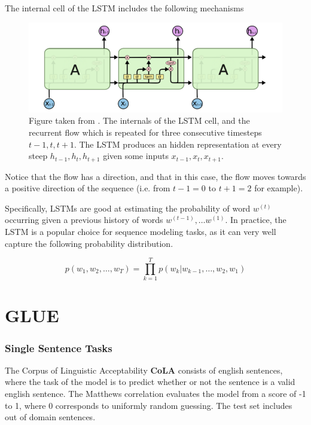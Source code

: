 \documentclass[a4paper,12pt,twoside,openright]{report}
\begin{document}
The internal cell of the LSTM includes the following mechanisms

\begin{figure}[h]
	\center
  \includegraphics[width=\linewidth]{./assets/background/LSTM.png}
  \caption{Figure taken from \cite{colahLSTM}. The internals of the LSTM cell, and the recurrent flow which is repeated for three consecutive timesteps $t-1, t, t+1$. 
  The LSTM produces an hidden representation at every steep $h_{t-1}, h_{t}, h_{t+1}$ given some inputs $x_{t-1}, x_t, x_{t+1}$.
  }
  \label{fig:lstm_internals}
\end{figure}

Notice that the flow has a direction, and that in this case, the flow moves towards a positive direction of the sequence (i.e. from $t-1 = 0$ to $t + 1 = 2$ for example).

Specifically, LSTMs \cite{hochreiter97} are good at estimating the probability of word $w^{(t)}$ occurring given a previous history of words $w^{(t-1)}, \ldots w^{(1)}$.
In practice, the LSTM is a popular choice for sequence modeling tasks, as it can very well capture the following probability distribution.

\begin{equation}
p\left(w_{1},  w_{2}, \ldots, w_{T} \right)=\prod_{k=1}^{T} p\left(w_{k} | w_{k-1}, \ldots, w_{2}, w_{1}\right)
\end{equation}

\section{GLUE}\label{appendix:GLUE}

\subsubsection{Single Sentence Tasks}

The Corpus of Linguistic Acceptability \textbf{CoLA} \cite{warstadt2018} consists of english sentences, where the task of the model is to predict whether or not the sentence is a valid english sentence.
The Matthews correlation evaluates the model from a score of -1 to 1, where 0 corresponds to uniformly random guessing.
The test set includes out of domain sentences.
\end{document}
